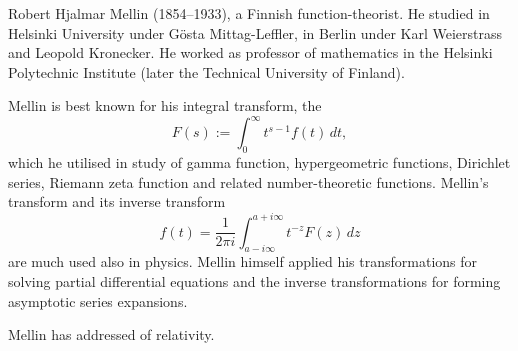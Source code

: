 \documentclass[12pt]{article}
\theoremstyle{definition}
\begin{document}
Robert Hjalmar Mellin (1854--1933), a Finnish function-theorist.  He studied in Helsinki University under G\"osta Mittag-Leffler, in Berlin under Karl Weierstrass and Leopold Kronecker.  He worked as professor of mathematics in the Helsinki Polytechnic Institute (later the Technical University of Finland).

Mellin is best known for his integral transform, the 
{\it {}}
$$F(s) := \int_0^\infty t^{s-1}f(t)\,dt,$$
which he utilised in study of gamma function, hypergeometric functions, Dirichlet series, Riemann zeta function and related number-theoretic functions.  Mellin's transform and its inverse transform
$$f(t) = \frac{1}{2\pi i}\int_{a-i\infty}^{a+i\infty}t^{-z}F(z)\,dz$$
are much used also in physics.  Mellin himself applied his transformations for solving partial differential equations and the inverse transformations for forming asymptotic series expansions.

Mellin has addressed  of relativity.

\end{document}

